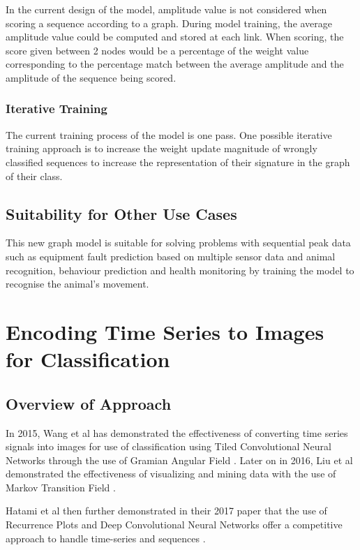 \documentclass[conference]{IEEEtran}
\begin{document}
In the current design of the model, amplitude value is not considered when scoring a sequence according to a graph. During model training, the average amplitude value could be computed and stored at each link. When scoring, the score given between 2 nodes would be a percentage of the weight value corresponding to the percentage match between the average amplitude and the amplitude of the sequence being scored. 

\subsubsection{Iterative Training}

The current training process of the model is one pass. One possible iterative training approach is to increase the weight update magnitude of wrongly classified sequences to increase the representation of their signature in the graph of their class.

\subsection{Suitability for Other Use Cases}

This new graph model is suitable for solving problems with sequential peak data such as equipment fault prediction based on multiple sensor data and animal recognition, behaviour prediction and health monitoring by training the model to recognise the animal’s movement.  

\section{Encoding Time Series to Images for Classification}

\subsection{Overview of Approach}
In 2015, Wang et al has demonstrated the effectiveness of converting time series signals into images for use of classification using Tiled Convolutional Neural Networks through the use of Gramian Angular Field \cite{inproceedings}. Later on in 2016, Liu et al demonstrated the effectiveness of visualizing and mining data with the use of Markov Transition Field \cite{liu2016encoding}.

Hatami et al then further demonstrated in their 2017 paper that the use of Recurrence Plots and Deep Convolutional Neural Networks offer a competitive approach to handle time-series and sequences \cite{hatami2017classification}.
\end{document}
